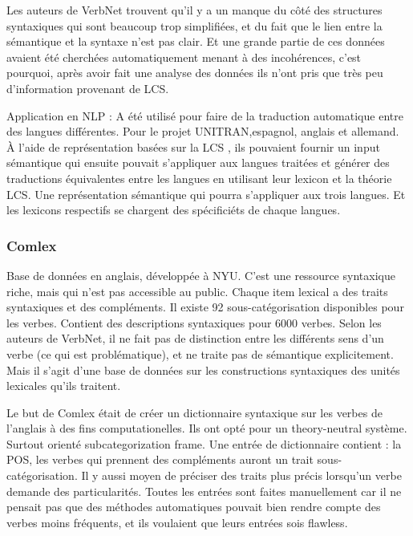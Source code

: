 Les auteurs de VerbNet trouvent qu'il y a un manque du côté des structures syntaxiques qui sont beaucoup trop simplifiées, et du fait que le lien entre la sémantique et la syntaxe n'est pas clair. Et une grande partie de ces données avaient été cherchées automatiquement menant à des incohérences, c'est pourquoi, après avoir fait une analyse des données ils n'ont pris que très peu d'information provenant de LCS.\citep{SchulerVerbnetBroadcoverageComprehensive2005}

Application en NLP : A été utilisé pour faire de la traduction automatique entre des langues différentes\citep{DorrUseLexicalSemantics1992}.  Pour le projet UNITRAN,espagnol, anglais et allemand. À l'aide de représentation basées sur la LCS , ils pouvaient fournir un input sémantique qui ensuite pouvait s'appliquer aux langues traitées et générer des traductions équivalentes entre les langues en utilisant leur lexicon et la théorie LCS. Une représentation sémantique qui pourra s'appliquer aux trois langues. Et les lexicons respectifs se chargent des spécificiéts de chaque langues.

\subsubsection{Comlex}
Base de données en anglais, développée à NYU. C'est une ressource syntaxique riche, mais qui n'est pas accessible au public. Chaque item lexical a des traits syntaxiques et  des compléments. Il existe 92 sous-catégorisation disponibles pour les verbes. Contient des descriptions syntaxiques pour 6000 verbes.  Selon les auteurs de VerbNet, il ne fait pas de distinction entre les différents sens d'un verbe (ce qui est problématique), et ne traite pas de sémantique explicitement. Mais il s'agit d'une base de données sur les constructions syntaxiques des unités lexicales qu'ils traitent.

Le but de Comlex était de \citep{Grishman:1994:CSB:991886.991931} créer un dictionnaire syntaxique sur les verbes de l'anglais à des fins computationelles. Ils ont opté pour un theory-neutral système. Surtout orienté subcategorization frame. Une entrée de dictionnaire contient :  la POS, les verbes qui prennent des compléments auront un trait sous-catégorisation. Il y aussi moyen de préciser des traits plus précis lorsqu'un verbe demande des particularités. Toutes les entrées sont faites manuellement car il ne pensait pas que des méthodes automatiques pouvait bien rendre compte des verbes moins fréquents, et ils voulaient que leurs entrées sois flawless.

